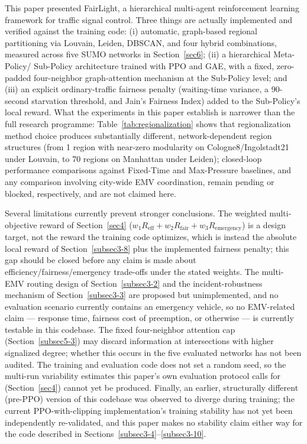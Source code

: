 \documentclass[3p,times]{elsarticle}
\theoremstyle{plain}
\theoremstyle{definition}
\begin{document}
This paper presented FairLight, a hierarchical multi-agent
reinforcement learning framework for traffic signal control. Three
things are actually implemented and verified against the training
code: (i) automatic, graph-based regional partitioning via Louvain,
Leiden, DBSCAN, and four hybrid combinations, measured across five SUMO
networks in Section~\ref{sec6}; (ii) a hierarchical Meta-Policy/
Sub-Policy architecture trained with PPO and GAE, with a fixed,
zero-padded four-neighbor graph-attention mechanism at the Sub-Policy
level; and (iii) an explicit ordinary-traffic fairness penalty
(waiting-time variance, a 90-second starvation threshold, and Jain's
Fairness Index) added to the Sub-Policy's local reward. What the
experiments in this paper establish is narrower than the full research
programme: Table~\ref{tab:regionalization} shows that regionalization
method choice produces substantially different, network-dependent
region structures (from 1 region with near-zero modularity on
Cologne8/Ingolstadt21 under Louvain, to 70 regions on Manhattan under
Leiden); closed-loop performance comparisons against Fixed-Time and
Max-Pressure baselines, and any comparison involving city-wide EMV
coordination, remain pending or blocked, respectively, and are not
claimed here.

Several limitations currently prevent stronger conclusions. The
weighted multi-objective reward of Section~\ref{sec4}
($w_1 R_{\text{eff}} + w_2 R_{\text{fair}} + w_3 R_{\text{emergency}}$)
is a design target, not the reward the training code optimizes, which
is instead the absolute local reward of Section~\ref{subsec3-8} plus
the implemented fairness penalty; this gap should be closed before any
claim is made about efficiency/fairness/emergency trade-offs under the
stated weights. The multi-EMV routing design of
Section~\ref{subsec3-2} and the incident-robustness mechanism of
Section~\ref{subsec3-3} are proposed but unimplemented, and no
evaluation scenario currently contains an emergency vehicle, so no
EMV-related claim --- response time, fairness cost of preemption, or
otherwise --- is currently testable in this codebase. The fixed
four-neighbor attention cap (Section~\ref{subsec5-3}) may discard
information at intersections with higher signalized degree; whether
this occurs in the five evaluated networks has not been audited. The
training and evaluation code does not set a random seed, so the
multi-run variability estimates this paper's own evaluation protocol
calls for (Section~\ref{sec4}) cannot yet be produced. Finally, an
earlier, structurally different (pre-PPO) version of this codebase was
observed to diverge during training; the current PPO-with-clipping
implementation's training stability has not yet been independently
re-validated, and this paper makes no stability claim either way for
the code described in Sections~\ref{subsec3-4}--\ref{subsec3-10}.
\end{document}
